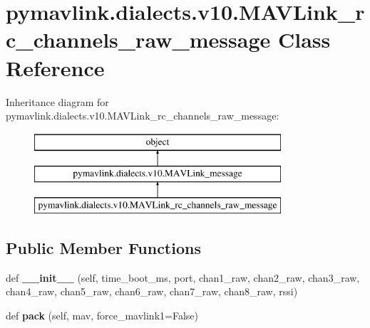 \hypertarget{classpymavlink_1_1dialects_1_1v10_1_1MAVLink__rc__channels__raw__message}{}\section{pymavlink.\+dialects.\+v10.\+M\+A\+V\+Link\+\_\+rc\+\_\+channels\+\_\+raw\+\_\+message Class Reference}
\label{classpymavlink_1_1dialects_1_1v10_1_1MAVLink__rc__channels__raw__message}
Inheritance diagram for pymavlink.\+dialects.\+v10.\+M\+A\+V\+Link\+\_\+rc\+\_\+channels\+\_\+raw\+\_\+message\+:\begin{figure}[H]
\begin{center}
\leavevmode
\includegraphics[height=3.000000cm]{classpymavlink_1_1dialects_1_1v10_1_1MAVLink__rc__channels__raw__message}
\end{center}
\end{figure}
\subsection*{Public Member Functions}
\begin{DoxyCompactItemize}
\item 
\mbox{\label{classpymavlink_1_1dialects_1_1v10_1_1MAVLink__rc__channels__raw__message_af439cf04cdac377256de342b53acfc94}} 
def {\bfseries \+\_\+\+\_\+init\+\_\+\+\_\+} (self, time\+\_\+boot\+\_\+ms, port, chan1\+\_\+raw, chan2\+\_\+raw, chan3\+\_\+raw, chan4\+\_\+raw, chan5\+\_\+raw, chan6\+\_\+raw, chan7\+\_\+raw, chan8\+\_\+raw, rssi)
\item 
\mbox{\label{classpymavlink_1_1dialects_1_1v10_1_1MAVLink__rc__channels__raw__message_a026d90f2419c11b21e2d94d31909f5e9}} 
def {\bfseries pack} (self, mav, force\+\_\+mavlink1=False)
\end{DoxyCompactItemize}
